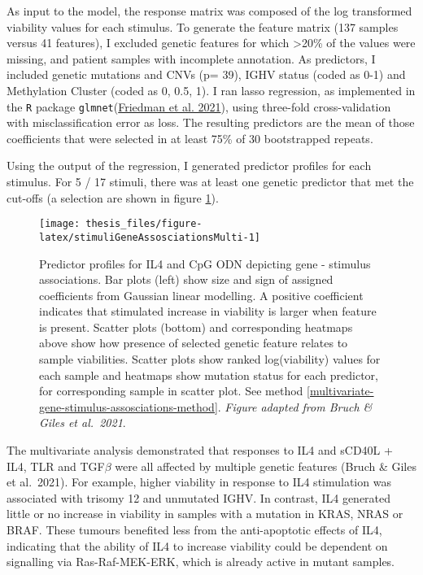 \documentclass[11pt, a4paper, twosided]{book}
\begin{document}
As input to the model, the response matrix was composed of the log transformed viability values for each stimulus. To generate the feature matrix (137 samples versus 41 features), I excluded genetic features for which \textgreater20\% of the values were missing, and patient samples with incomplete annotation. As predictors, I included genetic mutations and CNVs (p= 39), IGHV status (coded as 0-1) and Methylation Cluster (coded as 0, 0.5, 1). I ran lasso regression, as implemented in the \texttt{R} package \texttt{glmnet}(\protect\hyperlink{ref-R-glmnet}{Friedman et al. 2021}), using three-fold cross-validation with misclassification error as loss. The resulting predictors are the mean of those coefficients that were selected in at least 75\% of 30 bootstrapped repeats.

Using the output of the regression, I generated predictor profiles for each stimulus. For 5 / 17 stimuli, there was at least one genetic predictor that met the cut-offs (a selection are shown in figure \ref{fig:stimuliGeneAssosciationsMulti}).


\begin{figure}

{\centering \texttt{[image: thesis\_files/figure-latex/stimuliGeneAssosciationsMulti-1]} 

}

\caption{Predictor profiles for IL4 and CpG ODN depicting gene - stimulus associations. Bar plots (left) show size and sign of assigned coefficients from Gaussian linear modelling. A positive coefficient indicates that stimulated increase in viability is larger when feature is present. Scatter plots (bottom) and corresponding heatmaps above show how presence of selected genetic feature relates to sample viabilities. Scatter plots show ranked log(viability) values for each sample and heatmaps show mutation status for each predictor, for corresponding sample in scatter plot. See method \ref{multivariate-gene-stimulus-assosciations-method}. \emph{Figure adapted from Bruch \& Giles et al.~2021}.}\label{fig:stimuliGeneAssosciationsMulti}
\end{figure}
The multivariate analysis demonstrated that responses to IL4 and sCD40L + IL4, TLR and TGF\(\beta\) were all affected by multiple genetic features (Bruch \& Giles et al.~2021). For example, higher viability in response to IL4 stimulation was associated with trisomy 12 and unmutated IGHV. In contrast, IL4 generated little or no increase in viability in samples with a mutation in KRAS, NRAS or BRAF. These tumours benefited less from the anti-apoptotic effects of IL4, indicating that the ability of IL4 to increase viability could be dependent on signalling via Ras-Raf-MEK-ERK, which is already active in mutant samples.
\end{document}
